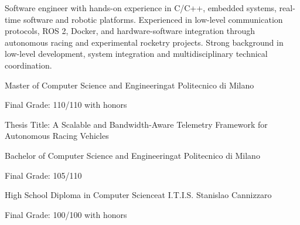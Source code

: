 \documentclass[10pt,onesize,a4paper,titlepage]{article}
\begin{document}
    \begin{tcolorbox}[grow to left by=0.55cm,colframe=white,colback=white,after skip=0pt]
        {
            \large Software engineer with hands-on experience in C/C++, embedded systems, real-time software and robotic platforms. Experienced in low-level communication protocols, ROS 2, Docker, and hardware-software integration through autonomous racing and experimental rocketry projects. Strong background in low-level development, system integration and multidisciplinary technical coordination. \par
            \vspace{0.4cm}
        }


        {Master of Computer Science and Engineering}{at Politecnico di Milano}
        {\begin{compactitem}[-]
            \item {Final Grade: 110/110 with honors}
            \item {Thesis Title: A Scalable and Bandwidth-Aware Telemetry Framework for Autonomous Racing Vehicles}
        \end{compactitem}
        }

        {Bachelor of Computer Science and Engineering}{at Politecnico di Milano}
        {\begin{compactitem}[-]
            \item Final Grade: 105/110
        \end{compactitem}
        }
    
        {High School Diploma in Computer Science}{at I.T.I.S. Stanislao Cannizzaro}
        {\begin{compactitem}[-]
            \item {Final Grade: 100/100 with honors}
        \end{compactitem}}
    \end{tcolorbox}
    
\end{document}
